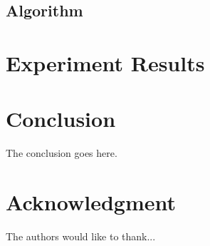 \documentclass[journal]{IEEEtran}
\begin{document}
\subsection{Algorithm}\label{sec:algorithm}
\section{Experiment Results}\label{sec:experiment-results}
\section{Conclusion}\label{sec:conclusion}
The conclusion goes here.



\appendices
\section*{Acknowledgment}


The authors would like to thank...






\end{document}
